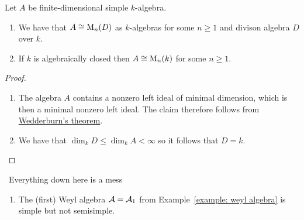 \begin{corollary}
  \label{corollary: wedderburn for algebras}
  Let $A$ be finite-dimensional simple $k$-algebra.
  \begin{enumerate}
    \item
      We have that $A \cong \operatorname{M}_n(D)$ as $k$-algebras for some $n \geq 1$ and divison algebra $D$ over $k$.
    \item
      If $k$ is algebraically closed then $A \cong \operatorname{M}_n(k)$ for some $n \geq 1$.
  \end{enumerate}
\end{corollary}


\begin{proof}
  \leavevmode
  \begin{enumerate}
    \item
      The algebra $A$ contains a nonzero left ideal of minimal dimension, which is then a minimal nonzero left ideal.
      The claim therefore follows from \hyperref[theorem: wedderburns theorem]{Wedderburn’s theorem}.
    \item
      We have that $\dim_k D \leq \dim_k A < \infty$ so it follows that $D = k$.
    \qedhere
  \end{enumerate}
\end{proof}







\noindent\hrulefill\, Everything down here is a mess \,\hrulefill




\begin{example}
  \label{example: simple but not semisimple}
  \leavevmode
  \begin{enumerate}
    \item
      The (first) Weyl algebra $\mathcal{A} = \mathcal{A}_1$ from Example~\ref{example: weyl algebra} is simple but not semisimple.
  \end{enumerate}
\end{example}
